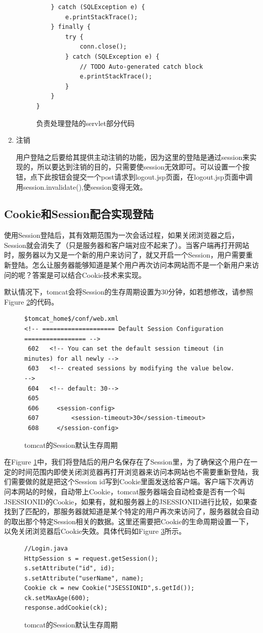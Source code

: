 \begin{enumerate}
\begin{figure}
\begin{lstlisting}
	} catch (SQLException e) {
		e.printStackTrace();
	} finally {
		try {
			conn.close();
		} catch (SQLException e) {
			// TODO Auto-generated catch block
			e.printStackTrace();
		}
	}
}
\end{lstlisting}
\caption{负责处理登陆的servlet部分代码}
\label{login3}
\end{figure}
\item
注销

用户登陆之后要给其提供主动注销的功能，因为这里的登陆是通过session来实现的，所以要达到注销的目的，只需要使session无效即可。可以设置一个按钮，点下此按钮会提交一个post请求到logout.jsp页面，在logout.jsp页面中调用session.invalidate(),使session变得无效。
\end{enumerate}
\subsection{Cookie和Session配合实现登陆}
使用Session登陆后，其有效期范围为一次会话过程，如果关闭浏览器之后，Session就会消失了（只是服务器和客户端对应不起来了）。当客户端再打开网站时，服务器以为又是一个新的用户来访问了，就又开启一个Session，用户需要重新登陆。怎么让服务器能够知道是某个用户再次访问本网站而不是一个新用户来访问的呢？答案是可以结合Cookie技术来实现。

默认情况下，tomcat会将Session的生存周期设置为30分钟，如若想修改，请参照Figure \ref{login4}的代码。
\begin{figure}
\begin{verbatim}
$tomcat_home$/conf/web.xml
<!-- ==================== Default Session Configuration ================= -->
 602   <!-- You can set the default session timeout (in minutes) for all newly -->
 603   <!-- created sessions by modifying the value below.    -->
 604   <!-- default: 30-->
 605 
 606     <session-config>
 607         <session-timeout>30</session-timeout>
 608     </session-config>

\end{verbatim}
\caption{tomcat的Session默认生存周期}
\label{login4}
\end{figure}

在Figure \ref{login3}中，我们将登陆后的用户名保存在了Session里，为了确保这个用户在一定的时间范围内即使关闭浏览器再打开浏览器来访问本网站也不需要重新登陆，我们需要做的就是把这个Session id写到Cookie里面发送给客户端。客户端下次再访问本网站的时候，自动带上Cookie，tomcat服务器端会自动检查是否有一个叫JSESSIONID的Cookie，如果有，就和服务器上的JSESSIONID进行比较，如果查找到了匹配的，那服务器就知道是某个特定的用户再次来访问了，服务器就会自动的取出那个特定Session相关的数据。这里还需要把Cookie的生命周期设置一下，以免关闭浏览器后Cookie失效。具体代码如Figure \ref{login5}所示。
\begin{figure}
\begin{verbatim}
//Login.java
HttpSession s = request.getSession();
s.setAttribute("id", id);
s.setAttribute("userName", name);
Cookie ck = new Cookie("JSESSIONID",s.getId());
ck.setMaxAge(600);
response.addCookie(ck);
\end{verbatim}
\caption{tomcat的Session默认生存周期}
\label{login5}
\end{figure}
